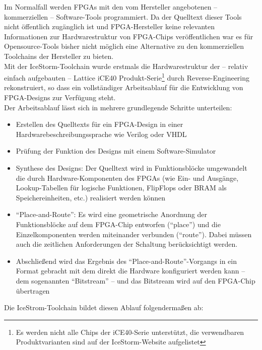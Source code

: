 Im Normalfall werden FPGAs mit den vom Hersteller angebotenen -- kommerziellen -- Software-Tools programmiert. Da der Quelltext dieser Tools nicht öffentlich zugänglich ist und FPGA-Hersteller keine relevanten Informationen zur Hardwarestruktur von FPGA-Chips veröffentlichen war es für Opensource-Tools bisher nicht möglich eine Alternative zu den kommerziellen Toolchains der Hersteller zu bieten.\\
Mit der IceStorm-Toolchain wurde erstmals die Hardwarestruktur der -- relativ einfach aufgebauten -- Lattice iCE40 Produkt-Serie\footnote{Es werden nicht alle Chips der iCE40-Serie unterstützt, die verwendbaren Produktvarianten sind auf der IceStorm-Website aufgelistet\cite{web:IceStorm}} durch \gls{Reverse-Engineering} rekonstruiert, so dass ein vollständiger Arbeitsablauf für die Entwicklung von FPGA-Designs zur Verfügung steht.\\
Der Arbeitsablauf lässt sich in mehrere grundlegende Schritte unterteilen:
\begin{itemize}
	\item Erstellen des Quelltexts für ein FPGA-Design in einer Hardwarebeschreibungssprache wie \gls{Verilog} oder \acrshort{VHDL}
	\item Prüfung der Funktion des Designs mit einem Software-Simulator
	\item Synthese des Designs: Der Quelltext wird in Funktionsblöcke umgewandelt die durch Hardware-Komponenten des FPGAs (wie Ein- und Ausgänge, Lookup-Tabellen für logische Funktionen, FlipFlops oder BRAM als Speichereinheiten, etc.) realisiert werden können
	\item ``Place-and-Route'': Es wird eine geometrische Anordnung der Funktionsblöcke auf dem FPGA-Chip entworfen (``place'') und die Einzelkomponenten werden miteinander verbunden (``route''). Dabei müssen auch die zeitlichen Anforderungen der Schaltung berücksichtigt werden.
	\item Abschließend wird das Ergebnis des ``Place-and-Route''-Vorgangs in ein Format gebracht mit dem direkt die Hardware konfiguriert werden kann -- dem sogenannten ``Bitstream'' -- und das Bitstream wird auf den FPGA-Chip übertragen
\end{itemize}

Die IceStrom-Toolchain bildet diesen Ablauf folgendermaßen ab:

